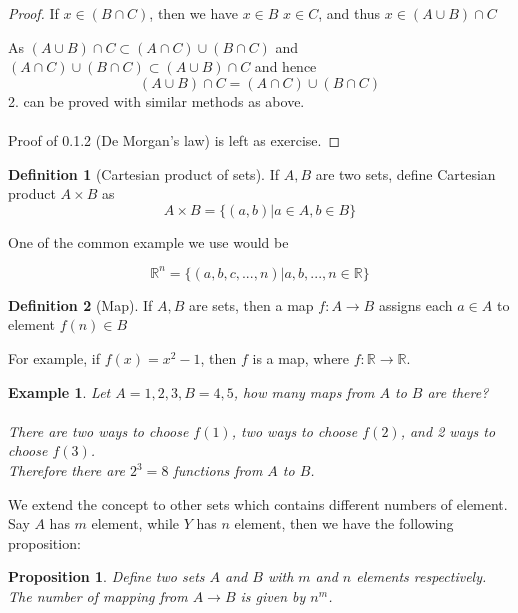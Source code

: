 \documentclass{article}
\theoremstyle{MyNonumberplain}
\theoremstyle{break}
\newtheorem*{proof}{Proof. }
\newcommand{\R}{\mathbb{R}}
\theoremstyle{break}
\newtheorem{proposition}{Proposition}[section]
\newtheorem{example}{Example}[section]
\theoremstyle{break}
\theoremstyle{definition}
\theoremstyle{break}
\newtheorem{definition}{Definition}[section]
\begin{document}
\begin{thmbox}
\begin{prfbox}
\begin{proof}
            If $x \in (B \cap C)$, then we have $x \in B$  $x \in C$, and thus $x \in
            (A \cup B) \cap C$
            
            As $(A \cup B) \cap C \subset (A \cap C) \cup (B \cap C)$ and $(A \cap C)
            \cup (B \cap C) \subset (A \cup B) \cap C$ and hence
            \[ (A \cup B) \cap C = (A \cap C) \cup (B \cap C) \]
            2. can be proved with similar methods as above.\\\\
            Proof of 0.1.2 (De Morgan's law) is left as exercise.
          \end{proof}
    \end{prfbox}
\end{thmbox}




\begin{defbox}
    \begin{definition}[Cartesian product of sets]
        If $A, B$ are two sets, define Cartesian product $A \times B$ as
        \[ A \times B = \{ (a, b) |a \in A, b \in B \} \]    
    \end{definition}    
\end{defbox}

One of the common example we use would be 

    $$\R^n=\{(a,b,c,...,n)|a,b,...,n\in\R\}$$

\begin{defbox}
    \begin{definition}[Map]
        If $A,B$ are sets, then a map $f:A\to B$ assigns each $a\in A$ to element $f(n)\in B$
    \end{definition}
\end{defbox}

For example, if $f(x)=x^2-1$, then $f$ is a map, where $f:\R\to\R$.

\begin{expbox}
    \begin{example}
        Let $A={1,2,3},B={4,5}$, how many maps from $A$ to $B$ are there?\\\\
        There are two ways to choose $f(1)$, two ways to choose $f(2)$, and 2 ways to choose $f(3)$. \\
        Therefore there are $2^3=8$ functions from $A$ to $B$.
    \end{example}
\end{expbox}

We extend the concept to other sets which contains different numbers of element. Say $A$ has $m$ element, while $Y$ has $n$ element, then we have the following proposition:
\begin{thmbox}
    \begin{proposition}
        Define two sets $A$ and $B$ with $m$ and $n$ elements respectively. The number of mapping from $A\to B$ is given by $n^m$.
    \end{proposition}
\end{thmbox}
\end{document}
